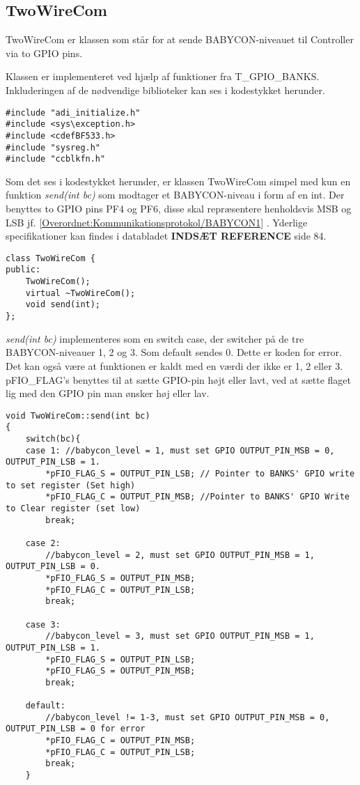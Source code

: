 \subsection{TwoWireCom}
TwoWireCom er klassen som står for at sende BABYCON-niveauet til Controller via to GPIO pins. 

Klassen er implementeret ved hjælp af funktioner fra T\_GPIO\_BANKS. Inkluderingen af de nødvendige biblioteker kan ses i kodestykket herunder. 

\begin{verbatim}
#include "adi_initialize.h"
#include <sys\exception.h>
#include <cdefBF533.h>
#include "sysreg.h"
#include "ccblkfn.h"
\end{verbatim}

Som det ses i kodestykket herunder, er klassen TwoWireCom simpel med kun en funktion \textit{send(int bc)} som modtager et BABYCON-niveau i form af en int.
Der benyttes to GPIO pins PF4 og PF6, disse skal repræsentere henholdsvis MSB og LSB jf. \ref{Overordnet:Kommunikationsprotokol/BABYCON1} . Yderlige specifikationer kan findes i databladet \textbf{INDSÆT REFERENCE} side 84. 

\begin{verbatim}
class TwoWireCom {
public:
	TwoWireCom();
	virtual ~TwoWireCom();
	void send(int);
};
\end{verbatim}

\textit{send(int bc)} implementeres som en switch case, der switcher på de tre BABYCON-niveauer 1, 2 og 3. Som default sendes 0. Dette er koden for error. Det kan også være at funktionen er kaldt med en værdi der ikke er 1, 2 eller 3.  
pFIO\_FLAG's benyttes til at sætte GPIO-pin højt eller lavt, ved at sætte flaget lig med den GPIO pin man ønsker høj eller lav. 

\begin{verbatim}
void TwoWireCom::send(int bc)
{
	switch(bc){
	case 1:	//babycon_level = 1, must set GPIO OUTPUT_PIN_MSB = 0, OUTPUT_PIN_LSB = 1.
		*pFIO_FLAG_S = OUTPUT_PIN_LSB; // Pointer to BANKS' GPIO write to set register (Set high)
		*pFIO_FLAG_C = OUTPUT_PIN_MSB; //Pointer to BANKS' GPIO Write to Clear register (set low)
		break;

	case 2:
		//babycon_level = 2, must set GPIO OUTPUT_PIN_MSB = 1, OUTPUT_PIN_LSB = 0.
		*pFIO_FLAG_S = OUTPUT_PIN_MSB;
		*pFIO_FLAG_C = OUTPUT_PIN_LSB;
		break;

	case 3:
		//babycon_level = 3, must set GPIO OUTPUT_PIN_MSB = 1, OUTPUT_PIN_LSB = 1.
		*pFIO_FLAG_S = OUTPUT_PIN_LSB;
		*pFIO_FLAG_S = OUTPUT_PIN_MSB;
		break;
		
	default:
		//babycon_level != 1-3, must set GPIO OUTPUT_PIN_MSB = 0, OUTPUT_PIN_LSB = 0 for error
		*pFIO_FLAG_C = OUTPUT_PIN_MSB;
		*pFIO_FLAG_C = OUTPUT_PIN_LSB;
		break;
	}
\end{verbatim}

